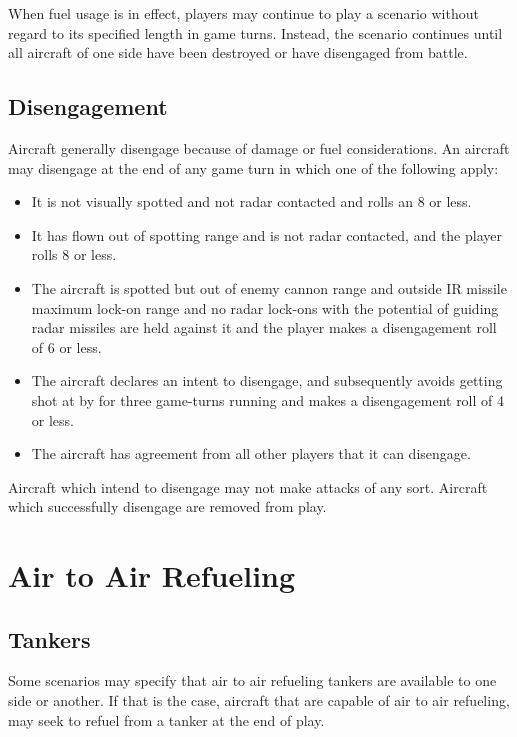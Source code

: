 When fuel usage is in effect, players may continue to play a scenario without regard to its specified length in game turns. Instead, the scenario continues until all aircraft of one side have been destroyed or have disengaged from battle.

\subsection{Disengagement} Aircraft generally disengage because of damage or fuel considerations. An aircraft may disengage at the end of any game turn in which one of the following apply:

\begin{itemize}

    \item It is not visually spotted and not radar contacted and rolls an 8 or less.

    \item It has flown out of spotting range and is not radar contacted, and the player rolls 8 or less.

    \item The aircraft is spotted but out of enemy cannon range and outside IR missile maximum lock-on range and no radar lock-ons with the potential of guiding radar missiles are held against it and the player makes a disengagement roll of 6 or less.

    \item The aircraft declares an intent to disengage, and subsequently avoids getting shot at by  for three game-turns running and makes a disengagement roll of 4 or less.

    \item The aircraft has agreement from all other players that it can disengage.

\end{itemize}

Aircraft which intend to disengage may not make attacks of any sort. Aircraft which successfully disengage are removed from play.

\section{Air to Air Refueling}
\label{rule:air-to-air-refueling}

\subsection{Tankers} Some scenarios may specify that air to air refueling tankers are available to one side or another. If that is the case, aircraft that are capable of air to air refueling, may seek to refuel from a tanker at the end of play.

